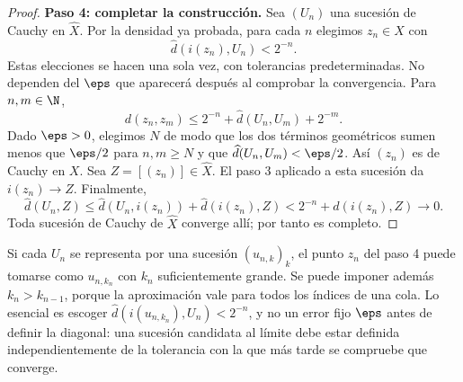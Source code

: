 \begin{proof}
\textbf{Paso 4: completar la construcción.} Sea $(U_n)$ una sucesión de Cauchy en $\widehat X$. Por la densidad ya probada, para cada $n$ elegimos $z_n\in X$ con
\[
 \widehat d(i(z_n),U_n)<2^{-n}.
\]
Estas elecciones se hacen una sola vez, con tolerancias predeterminadas. No dependen del $\eps$ que aparecerá después al comprobar la convergencia. Para $n,m\in\N$,
\[
 d(z_n,z_m)\leq 2^{-n}+\widehat d(U_n,U_m)+2^{-m}.
\]
Dado $\eps>0$, elegimos $N$ de modo que los dos términos geométricos sumen menos que $\eps/2$ para $n,m\geq N$ y que $\widehat d(U_n,U_m)<\eps/2$. Así $(z_n)$ es de Cauchy en $X$. Sea $Z=[(z_n)]\in\widehat X$. El paso 3 aplicado a esta sucesión da $i(z_n)\to Z$. Finalmente,
\[
 \widehat d(U_n,Z)\leq\widehat d(U_n,i(z_n))+\widehat d(i(z_n),Z)
 <2^{-n}+\widehat d(i(z_n),Z)\longrightarrow0.
\]
Toda sucesión de Cauchy de $\widehat X$ converge allí; por tanto es completo.
\end{proof}

\begin{observacion}
Si cada $U_n$ se representa por una sucesión $(u_{n,k})_k$, el punto $z_n$ del paso 4 puede tomarse como $u_{n,k_n}$ con $k_n$ suficientemente grande. Se puede imponer además $k_n>k_{n-1}$, porque la aproximación vale para todos los índices de una cola. Lo esencial es escoger $\widehat d(i(u_{n,k_n}),U_n)<2^{-n}$, y no un error fijo $\eps$ antes de definir la diagonal: una sucesión candidata al límite debe estar definida independientemente de la tolerancia con la que más tarde se compruebe que converge.
\end{observacion}

